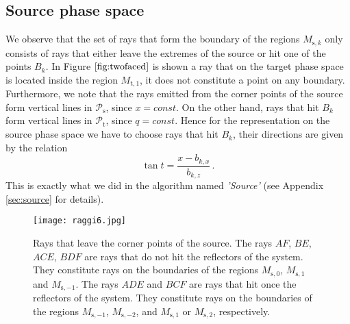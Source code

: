 \subsection{Source phase space}
We observe that the set of rays that form the boundary of the regions $M_{\textrm{s},k}$ only consists of rays that either leave the extremes of the source or hit one of the points
$B_k$. In Figure $\ref{fig:twofaced}$ is shown a ray that on the target phase space is located inside the region
$M_{\textrm{t},1}$, it does not constitute a point on any boundary. Furthermore, we note that the rays emitted from the corner points of the source form vertical lines in
$\mathcal{P}_\textrm{s}$, since $x = const$. On the other hand, rays that hit $B_k$ form vertical lines in $\mathcal{P}_\textrm{t}$, since $q = const$.
Hence for the representation on the source phase space we have to choose rays that hit $ B_{k} $, their directions are given by the relation \begin{equation}\label{anglesource}
\tan t = \frac{x-b_{k,x}}{b_{k,z}}\,.
\end{equation}
This is exactly what we did in the algorithm named \textit{'Source'} (see Appendix \ref{sec:source} for details).
\begin{figure}
\texttt{[image: raggi6.jpg]}
\caption{\footnotesize{Rays that leave the corner points of the source. The rays $AF$, $BE$, $ACE$, $BDF$ are rays that do not hit the reflectors of the system.
They constitute rays on the boundaries of the regions $M_{\textrm{s},0}$, $M_{\textrm{s},1}$ and $M_{\textrm{s},-1}$.
 The rays $ADE$ and $BCF$ are rays that hit once the reflectors of the system. They constitute rays on the boundaries of the regions
 $M_{\textrm{s},-1}$, $M_{\textrm{s},-2}$, and $M_{\textrm{s},1}$ or $M_{\textrm{s},2}$, respectively.}}
\label{fig:raggi}
\end{figure}

